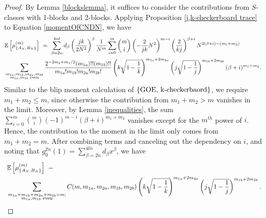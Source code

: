 \documentclass[11pt,reqno]{amsart}
\numberwithin{equation}{section}
\theoremstyle{plain}
\newcommand{\E}[1]{\mathbb{E}[#1]}
\begin{document}
\begin{proof}


By Lemma \ref{blockslemma}, it suffices to consider the contributions from $S$-classes with 1-blocks and 2-blocks. Applying Proposition \ref{j,k-checkerboard trace} to Equation \eqref{momentOfCNDN}, we have
\begin{align}
&\mathbb{E}\left[\mu^{(m)}_{\{A_N,B_N\}}\right] \ = \ \sum_{\beta=2n}^{4nl}d_\beta \left(\frac{jk}{2N^2}\right)^\beta \frac{1}{N^m}\sum_{i=0}^m\binom{m}{i}\left(-\frac{2}{jk}N^2\right)^{m-i}\left(\frac{2}{kj}\right)^{\beta+i}N^{2(\beta+i)-(m_1+m_2)}
\nonumber \\
&\sum_{\substack{m_{1a}, m_{1b}, m_{2a}, m_{2b} \\ m_{1a}, m_{1b}\textup{ even}}} \frac{2^{-2m_2+m_1/2}(m_{1a})!!(m_{1b})!!}{m_{1a}!m_{1b}!m_{2a}!m_{2b}!}\left(k\sqrt{1-\frac{1}{k}}\right)^{m_{1a}+2m_{2a}}\left(j\sqrt{1-\frac{1}{j}}\right)^{m_{1b}+2m_{2b}}(\beta+i)^{m_1+m_2}.
\end{align}
Similar to the blip moment calculation of $\{\textup{GOE, k-checkerbaord}\}$, we require $m_1+m_2\leq m$, since otherwise the contribution from $m_1+m_2>m$ vanishes in the limit. Moreover, by Lemma \ref{inequalities}, the sum $\sum_{i=0}^m\binom{m}{i}(-1)^{m-i}(\beta+i)^{m_1+m_2}$ vanishes except for the $m^{th}$ power of $i$. Hence, the contribution to the moment in the limit only comes from $m_1+m_2=m$. After combining terms and canceling out the dependency on $i$, and noting that $g_0^{2n}(1)=\sum_{\beta=2n}^{4ln}d_\beta x^\beta$, we have
\begin{align}
&\mathbb{E}\left[\mu^{(m)}_{\{A_N,B_N\}}\right] \ =\nonumber\\ \ &\sum_{\substack{m_{1a}+m_{1b}+m_{2a}+m_{2b}=m; \\ m_{1a},m_{1b}\textup{ even}}}C(m, m_{1a}, m_{2a}, m_{1b}, m_{2b})\left(k\sqrt{1-\frac{1}{k}}\right)^{m_{1a}+2m_{2a}}\left(j\sqrt{1-\frac{1}{j}}\right)^{m_{1b}+2m_{2b}}.
\end{align}
\end{proof}
\end{document}
